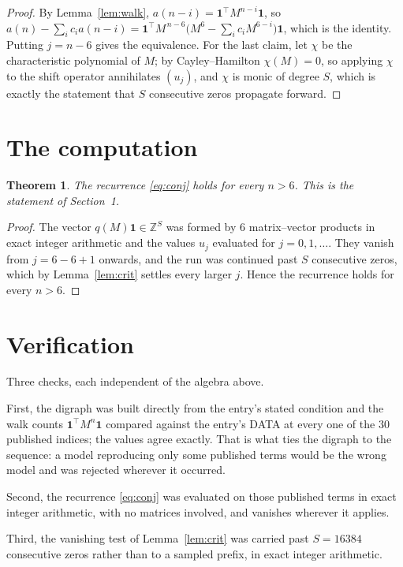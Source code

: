 \documentclass[11pt,a4paper]{article}
\theoremstyle{plain}
\newtheorem{theorem}{Theorem}
\theoremstyle{definition}
\begin{document}
\begin{proof}
By Lemma~\ref{lem:walk}, $a(n-i)=\mathbf{1}^{\!\top}M^{n-i}\mathbf{1}$, so
$a(n)-\sum_i c_i a(n-i)
=\mathbf{1}^{\!\top}M^{\,n-6}\bigl(M^{6}-\sum_i c_i M^{6-i}\bigr)
\mathbf{1}$, which is the identity. Putting $j=n-6$ gives the equivalence. For the
last claim, let $\chi$ be the characteristic polynomial of $M$; by Cayley--Hamilton
$\chi(M)=0$, so applying $\chi$ to the shift operator annihilates $(u_j)$, and $\chi$ is
monic of degree $S$, which is exactly the statement that $S$ consecutive zeros propagate
forward.
\end{proof}

\section{The computation}

\begin{theorem}
The recurrence \eqref{eq:conj} holds for every $n>6$. This is the statement of
Section~1.
\end{theorem}

\begin{proof}
The vector $q(M)\mathbf{1}\in\mathbb{Z}^{S}$ was formed by $6$ matrix--vector
products in exact integer arithmetic and the values $u_j$ evaluated for
$j=0,1,\dots$. They vanish from $j=6-6+1$ onwards, and the run was continued past
$S$ consecutive zeros, which by Lemma~\ref{lem:crit} settles every larger $j$. Hence the
recurrence holds for every $n>6$.
\end{proof}

\section{Verification}

Three checks, each independent of the algebra above.

First, the digraph was built directly from the entry's stated condition and the walk counts
$\mathbf{1}^{\!\top}M^{n}\mathbf{1}$ compared against the entry's DATA at every one of
the $30$ published indices; the values agree exactly. That is what ties the digraph to
the sequence: a model reproducing only some published terms would be the wrong model and
was rejected wherever it occurred.

Second, the recurrence \eqref{eq:conj} was evaluated on those published terms in exact
integer arithmetic, with no matrices involved, and vanishes wherever it applies.

Third, the vanishing test of Lemma~\ref{lem:crit} was carried past $S=16384$ consecutive
zeros rather than to a sampled prefix, in exact integer arithmetic.
\end{document}
